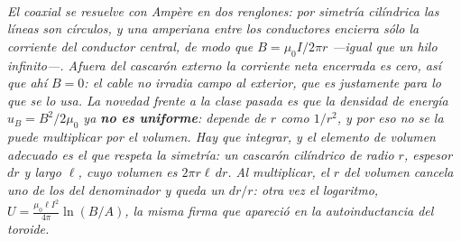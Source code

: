 \begin{center}
\\[0.5em]
{\small\itshape El coaxial se resuelve con Ampère en dos renglones: por simetría
cilíndrica las líneas son círculos, y una amperiana entre los conductores
encierra sólo la corriente del conductor central, de modo que
$B = \mu_0 I/2\pi r$ ---igual que un hilo infinito---. Afuera del cascarón
externo la corriente neta encerrada es cero, así que ahí $B = 0$: el cable no
irradia campo al exterior, que es justamente para lo que se lo usa. La novedad
frente a la clase pasada es que la densidad de energía $u_B = B^2/2\mu_0$ ya
\textbf{no es uniforme}: depende de $r$ como $1/r^2$, y por eso no se la puede
multiplicar por el volumen. Hay que integrar, y el elemento de volumen adecuado
es el que respeta la simetría: un cascarón cilíndrico de radio $r$, espesor $dr$
y largo $\ell$, cuyo volumen es $2\pi r \ell\,dr$. Al multiplicar, el $r$ del
volumen cancela uno de los del denominador y queda un $dr/r$: otra vez el
logaritmo, $U = \frac{\mu_0 \ell I^2}{4\pi}\ln(B/A)$, la misma firma que apareció
en la autoinductancia del toroide.}
\end{center}
